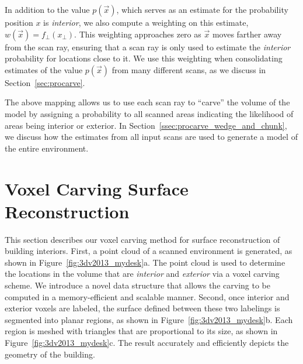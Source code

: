 \documentclass[12pt,onecolumn,oneside]{book}
\begin{document}
In addition to the value $p(\vec{x})$, which serves as an estimate for the probability position $x$ is {\it interior}, we also compute a weighting on this estimate, $w(\vec{x}) = f_{\perp}(x_{\perp})$.  This weighting approaches zero as $\vec{x}$ moves farther away from the scan ray, ensuring that a scan ray is only used to estimate the {\it interior} probability for locations close to it.  We use this weighting when consolidating estimates of the value $p(\vec{x})$ from many different scans, as we discuss in Section~\ref{sec:procarve}.

The above mapping allows us to use each scan ray to ``carve'' the volume of the model by assigning a probability to all scanned areas indicating the likelihood of areas being interior or exterior.  In Section~\ref{ssec:procarve_wedge_and_chunk}, we discuss how the estimates from all input scans are used to generate a model of the entire environment.  

\section{Voxel Carving Surface Reconstruction}
\label{sec:3dv2013}

This section describes our voxel carving method for surface reconstruction of building interiors.  First, a point cloud of a scanned environment is generated, as shown in Figure~\ref{fig:3dv2013_mydesk}a.  The point cloud is used to determine the locations in the volume that are {\it interior} and {\it exterior} via a voxel carving scheme.  We introduce a novel data structure that allows the carving to be computed in a memory-efficient and scalable manner.  Second, once interior and exterior voxels are labeled, the surface defined between these two labelings is segmented into planar regions, as shown in Figure~\ref{fig:3dv2013_mydesk}b.  Each region is meshed with triangles that are proportional to its size, as shown in Figure~\ref{fig:3dv2013_mydesk}c.  The result accurately and efficiently depicts the geometry of the building.
\end{document}
